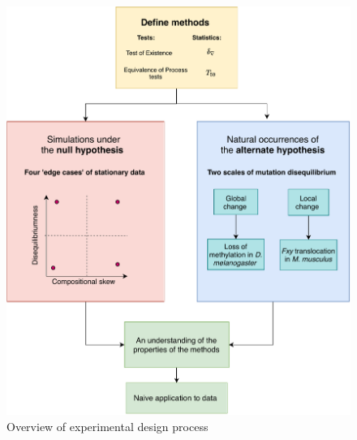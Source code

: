 \begin{figure}[htbp]
\centering
\includegraphics[width=\textwidth]{figures/diagrams/experimental_design.pdf}
\caption{Overview of experimental design process}
\label{fig:experimental_design}
\end{figure}